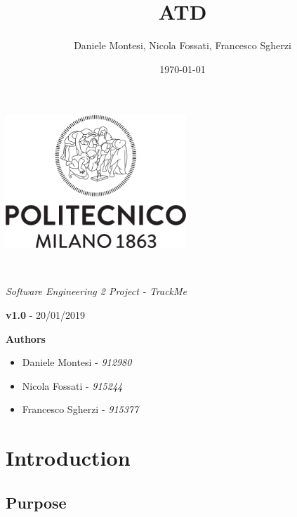 \documentclass[a4paper,oneside,11pt]{article}
\title{ATD}
\author{Daniele Montesi, Nicola Fossati, Francesco Sgherzi}
\date{\today}
\begin{document}
    \begin{titlingpage} 
        \begin{center}
            \includegraphics[height=5cm]{assets/Logo_Politecnico_Milano.png}\\
            \vspace{4cm}
            \begin{huge} 
                \textbf{\thetitle} \\
            \end{huge}
            \vspace{0.3cm}
                    \begin{Large}
                \textit{Software Engineering 2 Project - TrackMe} \\
            \end{Large}
        \end{center}
         \textbf{v1.0} - 20/01/2019 \\

            \vspace{4cm}
             \begin{large}
            \textbf{Authors}
            \begin{itemize}
                \item Daniele Montesi - \textit{912980} 
                \item Nicola Fossati - \textit{915244}
                \item Francesco Sgherzi - \textit{915377}
            \end{itemize}
        \end{large}
    \end{titlingpage}
    \newpage
    \tableofcontents
    \newpage
    \section{Introduction}
    
        \subsection{Purpose}
            
\end{document}
